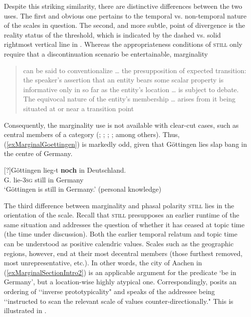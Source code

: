 Despite this striking similarity, there are distinctive differences between the two uses. The first and obvious one pertains to the temporal vs. non-temporal nature of the scales in question. The second, and more subtle, point of divergence is the reality status of the threshold, which is indicated by the dashed vs. solid rightmost vertical line in . Whereas the appropriateness conditions of \textsc{still} only require that a discontinuation scenario be entertainable, marginality

\begin{quote}
can be said to conventionalize … the presupposition of expected transition: the speaker’s assertion that an entity bears some scalar property is informative only in so far as the entity’s location … is subject to debate. The equivocal nature of the entity’s membership … arises from it being situated at or near a transition point \parencite[238]{Michaelis1993}
\end{quote}

Consequently, the marginality use is not available with clear-cut cases, such as central members of a category (\cite{Deloor2012}; \cite[181]{MosegaardHansen2008}; \cite{Muller1991}; \cite{Rombouts1979}; among others). Thus, (\ref{exMarginalGoettingen}) is markedly odd, given that Göttingen lies slap bang in the centre of Germany.

\begin{exe}
		\exi{}[?]{\gll Göttingen lieg-t \textbf{noch} in Deutschland.\\
		G. lie-3\textsc{sg} still in Germany\\
		\glt \lq Göttingen is still in Germany.' (personal knowledge)}
\end{exe}

The third difference between marginality and phasal polarity \textsc{still} lies in the orientation of the scale. Recall that \textsc{still} presupposes an earlier runtime of the same situation and addresses the question of whether it has ceased at topic time (the time under discussion). Both the earlier temporal relatum and topic time can be understood as positive calendric values. Scales such as the geographic regions, however, end at their most decentral members (those furthest removed, most unrepresentative, etc.). In other words, the city of Aachen in (\ref{exMarginalSectionIntro2}) is an applicable argument for the predicate \lq be in Germany', but a location-wise highly atypical one. Correspondingly, \textcite[9]{Umbach2009} posits an ordering of \lq\lq inverse prototypicality" and \textcite[175]{MosegaardHansen2008} speaks of the addressee being \lq\lq instructed to scan the relevant scale of values counter-directionally." This is illustrated in .

